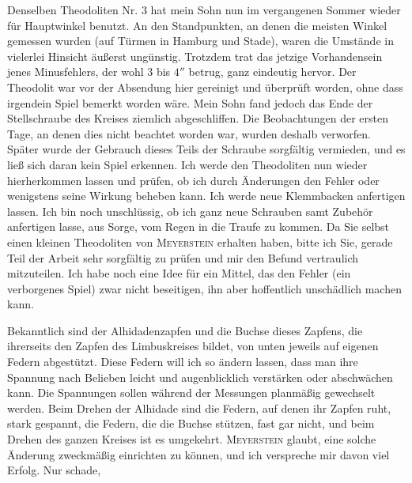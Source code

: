 \par\noindent\hspace*{\parindent}Denselben Theodoliten Nr. 3 hat mein Sohn nun im vergangenen Sommer wieder für Hauptwinkel benutzt. An den Standpunkten, an denen die meisten Winkel gemessen wurden (auf Türmen in Hamburg und Stade), waren die Umstände in vielerlei Hinsicht äußerst ungünstig. Trotzdem trat das jetzige Vorhandensein jenes Minusfehlers, der wohl 3 bis $4''$ betrug, ganz eindeutig hervor. Der Theodolit war vor der Absendung hier gereinigt und überprüft worden, ohne dass irgendein Spiel bemerkt worden wäre. Mein Sohn fand jedoch das Ende der Stellschraube des Kreises ziemlich abgeschliffen. Die Beobachtungen der ersten Tage, an denen dies nicht beachtet worden war, wurden deshalb verworfen. Später wurde der Gebrauch dieses Teils der Schraube sorgfältig vermieden, und es ließ sich daran kein Spiel erkennen. Ich werde den Theodoliten nun wieder hierherkommen lassen und prüfen, ob ich durch Änderungen den Fehler oder wenigstens seine Wirkung beheben kann. Ich werde neue Klemmbacken anfertigen lassen. Ich bin noch unschlüssig, ob ich ganz neue Schrauben samt Zubehör anfertigen lasse, aus Sorge, vom Regen in die Traufe zu kommen. Da Sie selbst einen kleinen Theodoliten von \textsc{Meyerstein} erhalten haben, bitte ich Sie, gerade  Teil der Arbeit sehr sorgfältig zu prüfen und mir den Befund vertraulich mitzuteilen. Ich habe noch eine Idee für ein Mittel, das den Fehler (ein verborgenes Spiel) zwar nicht beseitigen, ihn aber hoffentlich unschädlich machen kann.

\par\noindent\hspace*{\parindent}Bekanntlich sind der Alhidadenzapfen und die Buchse dieses Zapfens, die ihrerseits den Zapfen des Limbuskreises bildet, von unten jeweils auf eigenen Federn abgestützt. Diese Federn will ich so ändern lassen, dass man ihre Spannung nach Belieben leicht und augenblicklich verstärken oder abschwächen kann. Die Spannungen sollen während der Messungen planmäßig gewechselt werden. Beim Drehen der Alhidade sind die Federn, auf denen ihr Zapfen ruht, stark gespannt, die Federn, die die Buchse stützen, fast gar nicht, und beim Drehen des ganzen Kreises ist es umgekehrt. \textsc{Meyerstein} glaubt, eine solche Änderung zweckmäßig einrichten zu können, und ich verspreche mir davon viel Erfolg. Nur schade,
\par\medskip\noindent{}\par
